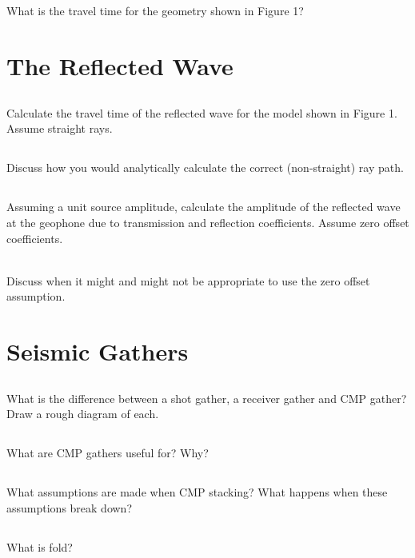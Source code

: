 \documentclass[a4paper, 10pt]{article}
\begin{document}
\subsection{}
What is the travel time for the geometry shown in Figure 1?
\newpage
\section{The Reflected Wave}
\subsection{}
Calculate the travel time of the reflected wave for the model shown in Figure 1. Assume straight rays.
\subsection{}
Discuss how you would analytically calculate the correct (non-straight) ray path.
\subsection{}
Assuming a unit source amplitude, calculate the amplitude of the reflected wave at the geophone due to transmission and reflection coefficients.  Assume zero offset coefficients.
\par~\\
Discuss when it might and might not be appropriate to use the zero offset assumption.

\section{Seismic Gathers}
\subsection{}
What is the difference between a shot gather, a receiver gather and  CMP gather? Draw a rough diagram of each.  
\subsection{}
What are CMP gathers useful for? Why?
\subsection{}
What assumptions are made when CMP stacking? What happens when these assumptions break down?
\subsection{}
What is fold?
\end{document}
